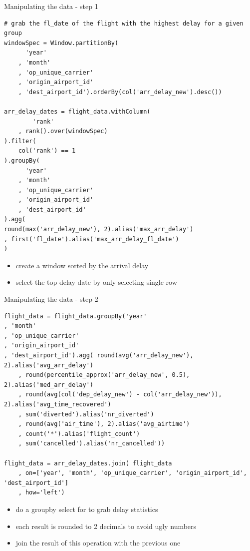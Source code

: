 \documentclass[10pt]{beamer}
\begin{document}
\begin{frame}[fragile]{Manipulating the data - step 1}
\begin{multicols}{2}
\begin{lstlisting}
# grab the fl_date of the flight with the highest delay for a given group
windowSpec = Window.partitionBy(
      'year'
    , 'month'
    , 'op_unique_carrier'
    , 'origin_airport_id'
    , 'dest_airport_id').orderBy(col('arr_delay_new').desc())
    
arr_delay_dates = flight_data.withColumn(
        'rank'
    , rank().over(windowSpec)
).filter(
    col('rank') == 1
).groupBy(
      'year'
    , 'month'
    , 'op_unique_carrier'
    , 'origin_airport_id'
    , 'dest_airport_id'
).agg(
round(max('arr_delay_new'), 2).alias('max_arr_delay')
, first('fl_date').alias('max_arr_delay_fl_date')
)
\end{lstlisting}
\columnbreak
\begin{itemize}
    \item create a window sorted by the arrival delay
    \item select the top delay date by only selecting single row
\end{itemize}
\end{multicols}
\end{frame}


\begin{frame}[fragile]{Manipulating the data - step 2}
\begin{multicols}{2}
\begin{lstlisting}
flight_data = flight_data.groupBy('year'
, 'month'
, 'op_unique_carrier'
, 'origin_airport_id'
, 'dest_airport_id').agg( round(avg('arr_delay_new'), 2).alias('avg_arr_delay')
    , round(percentile_approx('arr_delay_new', 0.5), 2).alias('med_arr_delay')
    , round(avg(col('dep_delay_new') - col('arr_delay_new')), 2).alias('avg_time_recovered')
    , sum('diverted').alias('nr_diverted')
    , round(avg('air_time'), 2).alias('avg_airtime')
    , count('*').alias('flight_count')
    , sum('cancelled').alias('nr_cancelled'))

flight_data = arr_delay_dates.join( flight_data
    , on=['year', 'month', 'op_unique_carrier', 'origin_airport_id', 'dest_airport_id']
    , how='left')
\end{lstlisting}
\columnbreak
\begin{itemize}
    \item do a groupby select for to grab delay statistics
    \item each result is rounded to 2 decimals to avoid ugly numbers
    \item join the result of this operation with the previous one
\end{itemize}
\end{multicols}
\end{frame}
\end{document}
